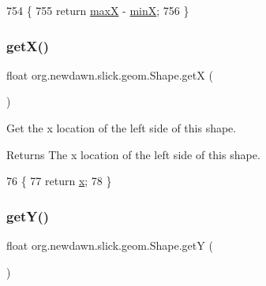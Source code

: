 \begin{DoxyCode}
754                             \{
755         \textcolor{keywordflow}{return} \mbox{\hyperlink{classorg_1_1newdawn_1_1slick_1_1geom_1_1_shape_a8c820b5a7df465beab7f021cdd09b826}{maxX}} - \mbox{\hyperlink{classorg_1_1newdawn_1_1slick_1_1geom_1_1_shape_a5bd07629e85d4a15fc03e3d60edb7c03}{minX}};
756     \}
\end{DoxyCode}
\mbox{\label{classorg_1_1newdawn_1_1slick_1_1geom_1_1_shape_a736a47bfdd6f164558b43fd497a3a3f3}} 
\subsubsection{\texorpdfstring{get\+X()}{getX()}}
{\footnotesize\ttfamily float org.\+newdawn.\+slick.\+geom.\+Shape.\+getX (\begin{DoxyParamCaption}{ }\end{DoxyParamCaption})\hspace{0.3cm}{\ttfamily [inline]}}

Get the x location of the left side of this shape.

\begin{DoxyReturn}{Returns}
The x location of the left side of this shape. 
\end{DoxyReturn}

\begin{DoxyCode}
76                         \{
77         \textcolor{keywordflow}{return} \mbox{\hyperlink{classorg_1_1newdawn_1_1slick_1_1geom_1_1_shape_a3e985bfff386c15a4efaad03d8ad60d3}{x}};
78     \}
\end{DoxyCode}
\mbox{\label{classorg_1_1newdawn_1_1slick_1_1geom_1_1_shape_a5f334f962d8fc525d522fe0f8ac20b35}} 
\subsubsection{\texorpdfstring{get\+Y()}{getY()}}
{\footnotesize\ttfamily float org.\+newdawn.\+slick.\+geom.\+Shape.\+getY (\begin{DoxyParamCaption}{ }\end{DoxyParamCaption})\hspace{0.3cm}{\ttfamily [inline]}}

